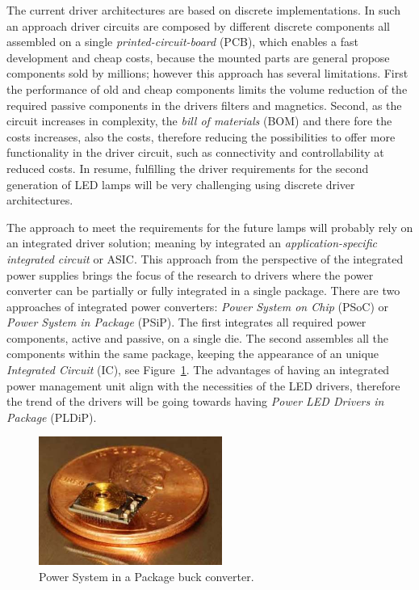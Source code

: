 The current driver architectures are based on discrete implementations. In such an approach driver circuits are composed by different discrete components all assembled on a single \emph{printed-circuit-board} (PCB), which enables a fast development and cheap costs, because the mounted parts are general propose components sold by millions; however this approach has several limitations. First the performance of old and cheap components limits the volume reduction of the required  passive components in the drivers filters and magnetics. Second, as the circuit increases in complexity, the \emph{bill of materials} (BOM) and there fore the costs increases, also the costs, therefore reducing the possibilities to offer more functionality in the driver circuit, such as connectivity and controllability at reduced costs. In resume, fulfilling the driver requirements for the second generation of LED lamps will be very challenging using  discrete driver  architectures.

The approach to meet the requirements for the future lamps will probably rely on an integrated driver solution; meaning by integrated an \emph{application-specific integrated circuit} or ASIC. This approach from the perspective of the integrated power supplies brings the focus of the research to drivers where the power converter can be partially or fully integrated in a single package. There are two approaches of integrated power converters: \emph{Power System on Chip} (PSoC) or  \emph{Power System in Package} (PSiP). The first integrates all required power components, active and passive, on a single die. The second assembles all the components within the same package, keeping the appearance of an unique \emph{Integrated Circuit} (IC), see Figure~\ref{fig:psoc_example}. The advantages of having an integrated power management unit align with the necessities of the LED drivers, therefore the trend of the drivers will be going towards having \emph{Power LED Drivers in Package} (PLDiP).

\begin{figure}[!h]
    \centering
    \includegraphics[width=6cm]{./0_intro/img/FSolzbacher01.jpg}
    \caption{Power System in a Package buck converter.}
    \label{fig:psoc_example}
\end{figure}

